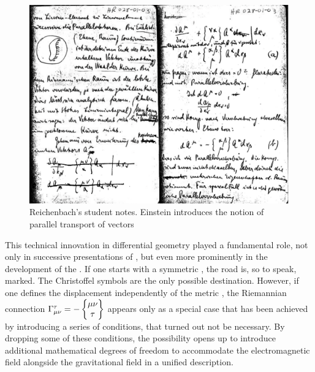 \documentclass[draft]{article}
\begin{document}

\begin{figure}
\begin{center}
 \includegraphics[scale=0.12, trim = 0mm 0mm 0mm 0mm, clip]{parallelverschiebungDOUB.png}
\caption{Reichenbach's student notes. Einstein introduces the notion of parallel transport of vectors}
\label{fig:parallel}
\end{center}
\end{figure}

This technical innovation in differential geometry played a fundamental role, not only in successive presentations of \gr \citep[see][]{Einstein1921}, but even more prominently in the development of the \uftp. If one starts with a symmetric \gmn, the road is, so to speak, marked. The Christoffel symbols are the only possible destination. However, if one defines the displacement \Gtmn independently of the metric \gmn, the Riemannian connection $\Gamma^\tau_{\mu\nu} = - \begin{Bmatrix} \mu \nu \\ \tau \end{Bmatrix}$ appears only as a special case that has been achieved by introducing a series of conditions, that turned out not be necessary. By dropping some of these conditions, the possibility opens up to introduce additional mathematical degrees of freedom to accommodate the electromagnetic field alongside the gravitational field in a unified  description.
\end{document}
